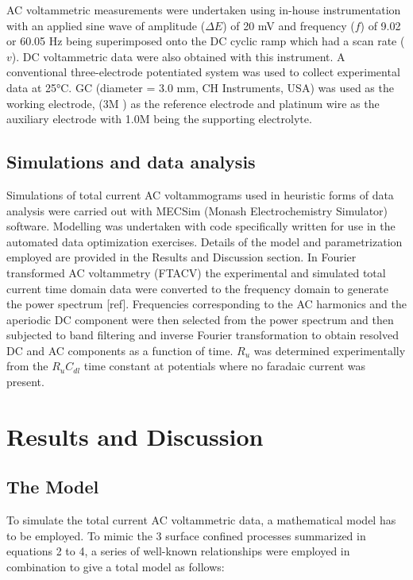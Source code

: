 \documentclass[a4paper, 12pt]{article}
\begin{document}
AC voltammetric measurements were undertaken using in-house instrumentation with 
an applied sine wave of amplitude ($\Delta E$) of 20 mV and frequency ($f$) of 
9.02 or 60.05 Hz being superimposed onto the DC cyclic ramp which had a scan 
rate ($v$).   DC voltammetric data were also obtained with this instrument. A 
conventional three-electrode potentiated system was used to collect experimental 
data at 25°C.  GC (diameter = 3.0 mm, CH Instruments, USA) was used as the 
working electrode,
 (3M ) as the reference electrode and platinum wire as the 
auxiliary electrode with 1.0M  being the supporting electrolyte.

\subsection{Simulations and data analysis}

Simulations of total current AC voltammograms used in heuristic forms of data 
analysis were carried out with MECSim (Monash Electrochemistry Simulator) 
software. Modelling was undertaken with code specifically written for use in the 
automated data optimization exercises. Details of the model and parametrization 
employed are provided in the Results and Discussion section.  In Fourier 
transformed  AC voltammetry (FTACV) the experimental and simulated total current 
time domain data were converted to the frequency domain to generate the power 
spectrum [ref]. Frequencies corresponding to the AC harmonics and the aperiodic 
DC component were then selected from the power spectrum and then subjected to 
band filtering and inverse Fourier transformation to obtain resolved DC and AC 
components as a function of time. $R_u$ was determined experimentally from the 
$R_u C_{dl}$ time constant at potentials where no faradaic current was present.

\section{Results and Discussion}

\subsection{The Model}

To simulate the total current AC voltammetric data, a mathematical model has to 
be employed. To mimic the 3 surface confined processes summarized in equations 2 
to 4, a series of well-known relationships were employed in combination to give 
a total model as follows:
\end{document}
